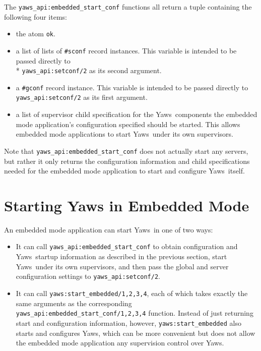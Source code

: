 \documentclass[11pt,oneside,english]{book}
\newcommand{\Yaws}            %
        {{\sc Yaws}}
\begin{document}
The \verb+yaws_api:embedded_start_conf+ functions all return a tuple
containing the following four items:

\begin{itemize}

\item the atom \verb+ok+.

\item a list of lists of \verb+#sconf+ record instances. This variable
  is intended to be passed directly to\\* \verb+yaws_api:setconf/2+ as
  its second argument.

\item a \verb+#gconf+ record instance. This variable is intended to
  be passed directly to \verb+yaws_api:setconf/2+ as its first
  argument.

\item a list of supervisor child specification for the
  \Yaws\  components the embedded mode application's configuration
  specified should be started. This allows embedded mode applications
  to start \Yaws\  under its own supervisors.

\end{itemize}

Note that \verb+yaws_api:embedded_start_conf+ does not actually start
any servers, but rather it only returns the configuration information
and child specifications needed for the embedded mode application to
start and configure \Yaws\  itself.

\section{Starting Yaws in Embedded Mode}

An embedded mode application can start \Yaws\  in one of two ways:

\begin{itemize}

\item It can call \verb+yaws_api:embedded_start_conf+ to obtain
  configuration and \Yaws\  startup information as described in the
  previous section, start \Yaws\  under its own supervisors, and then
  pass the global and server configuration settings to
  \verb+yaws_api:setconf/2+.

\item It can call \verb+yaws:start_embedded/1,2,3,4+, each of which
  takes exactly the same arguments as the corresponding
  \verb+yaws_api:embedded_start_conf/1,2,3,4+ function. Instead of just
  returning start and configuration information, however,
  \verb+yaws:start_embedded+ also starts and configures \Yaws{}, which
  can be more convenient but does not allow the embedded mode
  application any supervision control over \Yaws{}.

\end{itemize}
\end{document}
